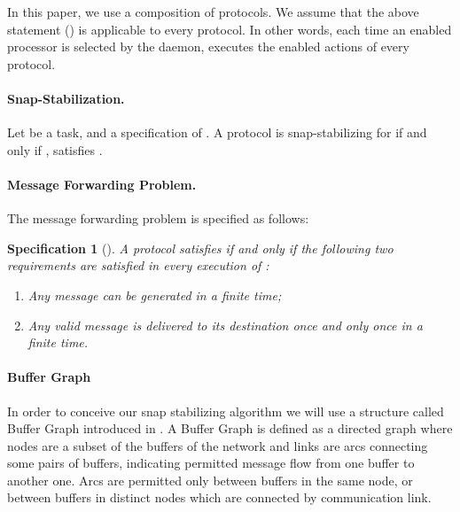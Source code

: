\documentclass{llncs}
\newtheorem{specification}{Specification}
\begin{document}
In this paper, we use a composition of protocols.  We assume that the above statement () is applicable to every
protocol. In other words, each time an enabled processor  is selected by the daemon,  executes the enabled actions of every protocol.










\paragraph{\textbf{Snap-Stabilization}.} 
Let  be a task, and  a specification of  . A protocol  is snap-stabilizing for  if and only if ,  satisfies .



\paragraph{\textbf{Message Forwarding Problem}.}



The message forwarding problem is specified as follows: 

\begin{specification}[]\label{spec:SP}
A protocol  satisfies  if and only if the following two requirements are satisfied in every execution of :
\begin{enumerate}
\item Any message can be generated in a finite time;
\item Any valid message is delivered to its destination once and only once in a finite time.
\end{enumerate}
\end{specification}



\paragraph{\textbf{Buffer Graph}} 



In order to conceive our snap stabilizing algorithm we will use a structure called Buffer Graph introduced in \cite{MS78}. A Buffer Graph is defined as a directed graph where nodes are a subset of the buffers of the network and links are arcs connecting some pairs of buffers, indicating permitted message flow from one buffer to another one. Arcs are permitted only between buffers in the same node, or between buffers in distinct nodes which are connected by communication link.
\end{document}
